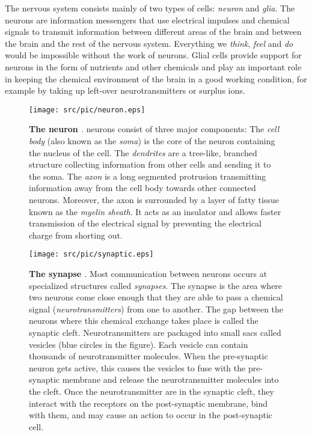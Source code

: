 The nervous system consists mainly of two types of cells: \emph{neuron} and \emph{glia}. The neurons are information messengers that use electrical impulses and chemical signals to transmit information between different areas of the brain and between the brain and the rest of the nervous system. Everything we \emph{think}, \emph{feel} and \emph{do} would be impossible without the work of neurons. Glial cells provide support for neurons in the form of nutrients and other chemicals and play an important role in keeping the chemical environment of the brain in a good working condition, for example by taking up left-over neurotransmitters or surplus ions.

\begin{figure}[ht!]
  \centering
  \texttt{[image: src/pic/neuron.eps]}
  \caption{\textbf{The neuron \cite[taken from][]{introductiontopsychology}}. neurons consist of three major components: The \emph{cell body} (also known as the \emph{soma}) is the core of the neuron containing the nucleus of the cell. The \emph{dendrites} are a tree-like, branched structure collecting information from other cells and sending it to the soma. The \emph{axon} is a long segmented protrusion transmitting information away from the cell body towards other connected neurons. Moreover, the axon is surrounded by a layer of fatty tissue known as the \emph{myelin sheath}. It acts as an insulator and allows faster transmission of the electrical signal by preventing the electrical charge from shorting out.}
  \label{fig:neuron}
\end{figure}

\begin{figure}[ht!]
  \centering
  \texttt{[image: src/pic/synaptic.eps]}
  \caption{\textbf{The synapse \citep[taken from][]{Neurotransmitters}}. Most communication between neurons occurs at specialized structures called \emph{synapses}. The synapse is the area where two neurons come close enough that they are able to pass a chemical signal (\emph{neurotransmitters}) from one to another. The gap between the neurons where this chemical exchange takes place is called the synaptic cleft. Neurotransmitters are packaged into small sacs called vesicles (blue circles in the figure). Each vesicle can contain thousands of neurotransmitter molecules. When the pre-synaptic neuron gets active, this causes the vesicles to fuse with the pre-synaptic membrane and release the neurotransmitter molecules into the cleft. Once the neurotransmitter are in the synaptic cleft, they interact with the receptors on the post-synaptic membrane, bind with them, and may cause an action to occur in the post-synaptic cell.}
  \label{fig:synapse}
\end{figure}

